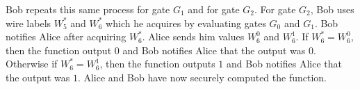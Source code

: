 Bob repeats this same process for gate $G_1$ and for gate $G_2$.
For gate $G_2$, Bob uses wire labels $W_5^*$ and $W_6^*$ which he acquires by evaluating gates $G_0$ and $G_1$.
Bob notifies Alice after acquiring $W_6^*$.
Alice sends him values $W_6^0$ and $W_6^1$.
If $W_6^* = W_6^0$, then the function output $0$ and Bob notifies Alice that the output was $0$.
Otherwise if $W_6^* = W_6^1$, then the function outputs $1$ and Bob notifies Alice that the output was $1$.
Alice and Bob have now securely computed the function.

%
%
%
%

